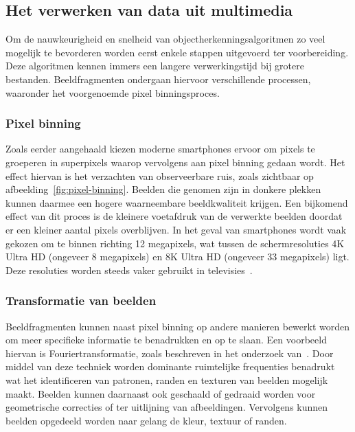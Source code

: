 
\subsection{Het verwerken van data uit multimedia}\label{subsec:het-verwerken-van-data}
Om de nauwkeurigheid en snelheid van objectherkenningsalgoritmen zo veel mogelijk te bevorderen worden eerst enkele stappen uitgevoerd ter voorbereiding.
Deze algoritmen kennen immers een langere verwerkingstijd bij grotere bestanden.
Beeldfragmenten ondergaan hiervoor verschillende processen, waaronder het voorgenoemde pixel binningsproces.

\subsubsection{Pixel binning}
Zoals eerder aangehaald kiezen moderne smartphones ervoor om pixels te groeperen in superpixels waarop vervolgens aan pixel binning gedaan wordt.
Het effect hiervan is het verzachten van observeerbare ruis, zoals zichtbaar op afbeelding~\ref{fig:pixel-binning}.
Beelden die genomen zijn in donkere plekken kunnen daarmee een hogere waarneembare beeldkwaliteit krijgen.
Een bijkomend effect van dit proces is de kleinere voetafdruk van de verwerkte beelden doordat er een kleiner aantal pixels overblijven.
In het geval van smartphones wordt vaak gekozen om te binnen richting 12 megapixels, wat tussen de schermresoluties 4K Ultra HD (ongeveer 8 megapixels) en 8K Ultra HD (ongeveer 33 megapixels) ligt.
Deze resoluties worden steeds vaker gebruikt in televisies~\autocite{Statista2024}.

\subsubsection{Transformatie van beelden}
Beeldfragmenten kunnen naast pixel binning op andere manieren bewerkt worden om meer specifieke informatie te benadrukken en op te slaan.
Een voorbeeld hiervan is Fouriertransformatie, zoals beschreven in het onderzoek van~\textcite{Olaoye2024}.
Door middel van deze techniek worden dominante ruimtelijke frequenties benadrukt wat het identificeren van patronen, randen en texturen van beelden mogelijk maakt.
Beelden kunnen daarnaast ook geschaald of gedraaid worden voor geometrische correcties of ter uitlijning van afbeeldingen.
Vervolgens kunnen beelden opgedeeld worden naar gelang de kleur, textuur of randen.

